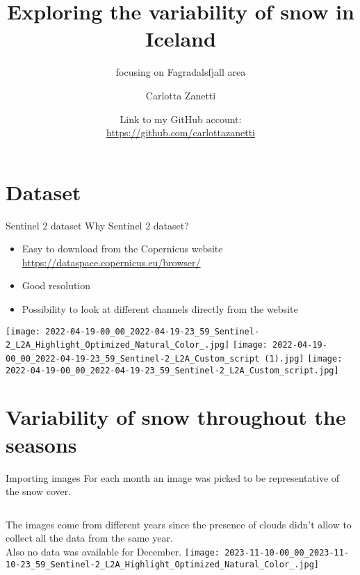 \documentclass{beamer}
\title{Exploring the variability of snow in Iceland}
\subtitle{focusing on Fagradalsfjall area }
\author{Carlotta Zanetti}
\date{\small{ Link to my GitHub account:\\ \url{https://github.com/carlottazanetti}}}
\institute{Alma Mater Studiorum UniBO}
\begin{document}
\maketitle



\section{Dataset}

\begin{frame}{Sentinel 2 dataset}
    \small{Why Sentinel 2 dataset?}
     \begin{itemize}
  \item Easy to download from the Copernicus website \url{https://dataspace.copernicus.eu/browser/}
  \item Good resolution 
  \item Possibility to look at different channels directly from the website
 \end{itemize}
 \texttt{[image: 2022-04-19-00\_00\_2022-04-19-23\_59\_Sentinel-2\_L2A\_Highlight\_Optimized\_Natural\_Color\_.jpg]}
 \texttt{[image: 2022-04-19-00\_00\_2022-04-19-23\_59\_Sentinel-2\_L2A\_Custom\_script (1).jpg]}
 \texttt{[image: 2022-04-19-00\_00\_2022-04-19-23\_59\_Sentinel-2\_L2A\_Custom\_script.jpg]}
\end{frame}


\section{Variability of snow throughout the seasons}

\begin{frame}{Importing images}
    \small{For each month an image was picked to be representative of the 
    snow cover.}
    \smallskip
        \begin{columns}
        \small{The images come from different years since the presence of clouds didn't allow to collect all the data from the same year. \\Also no data was available for December.}
        \centering
        \texttt{[image: 2023-11-10-00\_00\_2023-11-10-23\_59\_Sentinel-2\_L2A\_Highlight\_Optimized\_Natural\_Color\_.jpg]}
    \end{columns}
\end{frame}
\end{document}
